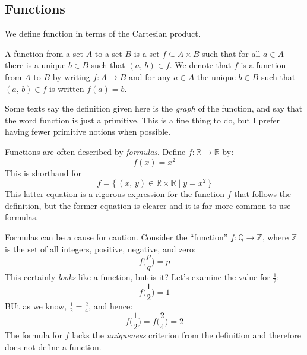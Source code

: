         \subsection{Functions}
            We define function in terms of the Cartesian product.
            \begin{definition}
                A function from a set $A$ to a set $B$ is a set
                $f\subseteq{A}\times{B}$ such that for all $a\in{A}$ there is
                a unique $b\in{B}$ such that $(a,\,b)\in{f}$. We denote that
                $f$ is a function from $A$ to $B$ by writing
                $f:A\rightarrow{B}$ and for any $a\in{A}$ the unique $b\in{B}$
                such that $(a,\,b)\in{f}$ is written
                $f(a)=b$.
            \end{definition}
            Some texts say the definition given here is the
            \textit{graph} of the function, and say that the word function is
            just a primitive. This is a fine thing to do, but I prefer having
            fewer primitive notions when possible.
            \begin{example}
                Functions are often described by \textit{formulas}. Define
                $f:\mathbb{R}\rightarrow\mathbb{R}$ by:
                \begin{equation}
                    f(x)=x^{2}
                \end{equation}
                This is shorthand for
                \begin{equation}
                    f=\{\,(x,\,y)\in\mathbb{R}\times\mathbb{R}\;|\;
                        y=x^{2}\,\}
                \end{equation}
                This latter equation is a rigorous expression for the function
                $f$ that follows the definition, but the former equation is
                clearer and it is far more common to use formulas.
            \end{example}
            \begin{example}
                Formulas can be a cause for caution. Consider the
                ``function'' $f:\mathbb{Q}\rightarrow\mathbb{Z}$, where
                $\mathbb{Z}$ is the set of all integers, positive, negative,
                and zero:
                \begin{equation}
                    f\big(\frac{p}{q}\big)=p
                \end{equation}
                This certainly \textit{looks} like a function, but is it?
                Let's examine the value for $\frac{1}{2}$:
                \begin{equation}
                    f\big(\frac{1}{2}\big)=1
                \end{equation}
                BUt as we know, $\frac{1}{2}=\frac{2}{4}$, and hence:
                \begin{equation}
                    f\big(\frac{1}{2}\big)=f\big(\frac{2}{4}\big)=2
                \end{equation}
                The formula for $f$ lacks the \textit{uniqueness} criterion from
                the definition and therefore does not define a function.
            \end{example}
